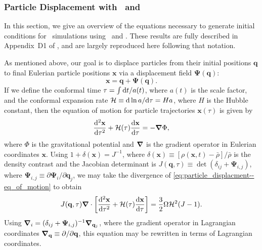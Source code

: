 \subsubsection{Particle Displacement with \za\ and \lpt}
\label{subsubsec:computational_theory--perturbation_theory--particle_displacement}


In this section, we give an overview of the equations necessary to generate initial conditions for \nbody\ simulations using \za\ and \lpt.  These results are fully described in Appendix~D1 of \citet{1998MNRAS.299.1097S}, and are largely reproduced here following that notation.

As mentioned above, our goal is to displace particles from their initial positions $\mathbf{q}$ to final Eulerian particle positions $\mathbf{x}$ via a displacement field $\boldsymbol{\Psi}(\mathbf{q})$:
\begin{equation}
	\mathbf{x} = \mathbf{q} + \boldsymbol{\Psi}(\mathbf{q}).
\end{equation}
If we define the conformal time $\tau = \int {\rm {d}} t / a(t)$, where $a(t)$ is the scale factor, and the conformal expansion rate $\mathcal{H} \equiv {\rm {d}} \ln a/{\rm {d}} \tau = H a$, where $H$ is the Hubble constant, then the equation of motion for particle trajectories $\mathbf{x}(\tau)$ is given by
\begin{equation} \label{eq:particle_displacment--eq_of_motion}
	\frac{{\rm {d}}^{2} \mathbf{x}}{{\rm {d}} \tau^{2}} + \mathcal{H}(\tau) \frac{{\rm {d}} \mathbf{x}}{{\rm {d}} \tau} = -{\boldsymbol{\nabla}} \Phi,
\end{equation}
where $\Phi$ is the gravitational potential and ${\boldsymbol{\nabla}}$ is the gradient operator in Eulerian coordinates $\mathbf{x}$.  Using $1 + \delta(\mathbf{x}) = J^{-1}$, where $\delta(\mathbf{x}) \equiv [\rho(\mathbf{x},t) - \bar{\rho}] / \bar{\rho}$ is the density contrast and the Jacobian determinant is $J(\mathbf{q}, \tau) \equiv \det(\delta_{ij} + \boldsymbol{\Psi}_{i,j})$, where $\boldsymbol{\Psi}_{i,j} \equiv \partial \boldsymbol{\Psi}_{i} / \partial \mathbf{q}_{j}$, we may take the divergence of \ref{eq:particle_displacment--eq_of_motion} to obtain
\begin{equation} \label{eq:particle_displacement--div_eq_of_motion}
	J(\mathbf{q}, \tau) {\boldsymbol{\nabla}} \cdot \left[ \frac{{\rm {d}}^{2} \mathbf{x}}{{\rm {d}} \tau^{2}} + \mathcal{H}(\tau) \frac{{\rm {d}} \mathbf{x}}{{\rm {d}} \tau} \right]
	= \frac{3}{2} \Omega \mathcal{H}^{2}(J - 1).
\end{equation}
Using ${\boldsymbol{\nabla}}_{i} = (\delta_{ij} + \boldsymbol{\Psi}_{i,j})^{-1} {\boldsymbol{\nabla}}_{\mathbf{q}_{j}}$, where the gradient operator in Lagrangian coordinates ${\boldsymbol{\nabla}}_{\mathbf{q}} \equiv \partial / \partial \mathbf{q}$, this equation may be rewritten in terms of Lagrangian coordinates.

